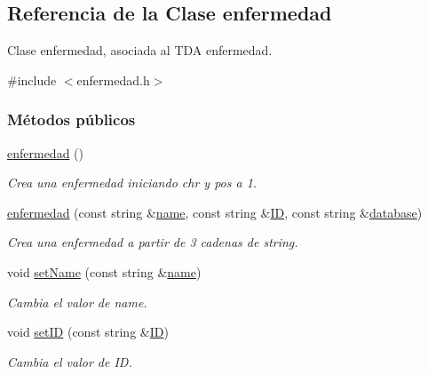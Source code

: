 \hypertarget{classenfermedad}{}\subsection{Referencia de la Clase enfermedad}
\label{classenfermedad}


Clase enfermedad, asociada al T\+DA enfermedad.  




{\ttfamily \#include $<$enfermedad.\+h$>$}

\subsubsection*{Métodos públicos}
\begin{DoxyCompactItemize}
\item 
\hyperlink{classenfermedad_a60eb5e620b0bf9a53d4f0980031aeefd}{enfermedad} ()
\begin{DoxyCompactList}\small\item\em Crea una enfermedad iniciando chr y pos a 1. \end{DoxyCompactList}\item 
\hyperlink{classenfermedad_a7caef55b00a31ce18191ceaba81ed20c}{enfermedad} (const string \&\hyperlink{classenfermedad_ad7c4204057028a73bde6022678c6813e}{name}, const string \&\hyperlink{classenfermedad_a689cdbd469ecc28e045bda2f62a229d2}{ID}, const string \&\hyperlink{classenfermedad_a3684b7ec850d4c9357dd21bdd5e02803}{database})
\begin{DoxyCompactList}\small\item\em Crea una enfermedad a partir de 3 cadenas de string. \end{DoxyCompactList}\item 
void \hyperlink{classenfermedad_a18f621d13de01c0b06a05757ddd8a087}{set\+Name} (const string \&\hyperlink{classenfermedad_ad7c4204057028a73bde6022678c6813e}{name})
\begin{DoxyCompactList}\small\item\em Cambia el valor de name. \end{DoxyCompactList}\item 
void \hyperlink{classenfermedad_a5ad52bdce8de9ac4fe25b460dc699af4}{set\+ID} (const string \&\hyperlink{classenfermedad_a689cdbd469ecc28e045bda2f62a229d2}{ID})
\begin{DoxyCompactList}\small\item\em Cambia el valor de ID. \end{DoxyCompactList}\item 

\end{DoxyCompactItemize}
